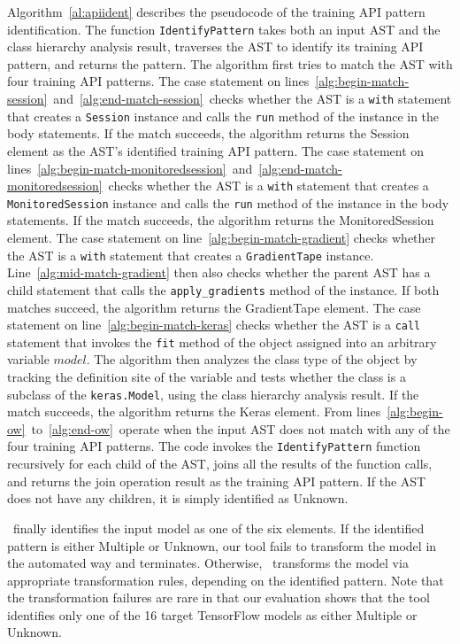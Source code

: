 Algorithm~\ref{al:apiident} describes the pseudocode of the training API
pattern identification.
The function {\tt IdentifyPattern} takes both an input AST and the class
hierarchy analysis result, traverses the AST to identify its training API
pattern, and returns the pattern.
The algorithm first tries to match the AST with four training API patterns.
The case statement on
lines~\ref{alg:begin-match-session}~and~\ref{alg:end-match-session}~checks
whether the AST is a {\tt with} statement that creates a {\tt Session} instance
and calls the {\tt run} method of the instance in the body statements.  If the
match succeeds, the algorithm returns the Session element as the AST's
identified training API pattern.
The case statement on
lines~\ref{alg:begin-match-monitoredsession}~and~\ref{alg:end-match-monitoredsession}~checks
whether the AST is a {\tt with} statement that creates a {\tt MonitoredSession}
instance and calls the {\tt run} method of the instance in the body statements.
If the match succeeds, the algorithm returns the MonitoredSession element.
The case statement on line~\ref{alg:begin-match-gradient} checks whether the
AST is a {\tt with} statement that creates a {\tt GradientTape} instance.
Line~\ref{alg:mid-match-gradient} then also checks whether the parent AST has a
child statement that calls the {\tt apply\_gradients} method of the instance.
If both matches succeed, the algorithm returns the GradientTape element.
The case statement on line~\ref{alg:begin-match-keras} checks whether the AST
is a {\tt call} statement that invokes the {\tt fit} method of the object
assigned into an arbitrary variable $model$.
The algorithm then analyzes the class type of the object by tracking the
definition site of the variable and tests whether the class is a subclass of
the {\tt keras.Model}, using the class hierarchy analysis result.
If the match succeeds, the algorithm returns the Keras element.
From lines~\ref{alg:begin-ow}~to~\ref{alg:end-ow}~operate when the input AST
does not match with any of the four training API patterns.
The code invokes the {\tt IdentifyPattern} function recursively for each child
of the AST, joins all the results of the function calls, and returns the join
operation result as the training API pattern.
If the AST does not have any children, it is simply identified as Unknown.


\tapi~finally identifies the input model as one of the six elements.
If the identified pattern is either Multiple or Unknown, our tool fails to
transform the model in the automated way and terminates. 
Otherwise, \atran~transforms the model via appropriate transformation rules,
depending on the identified pattern.
Note that the transformation failures are rare in that our evaluation shows
that the tool identifies only one of the 16 target TensorFlow models as either
Multiple or Unknown.


